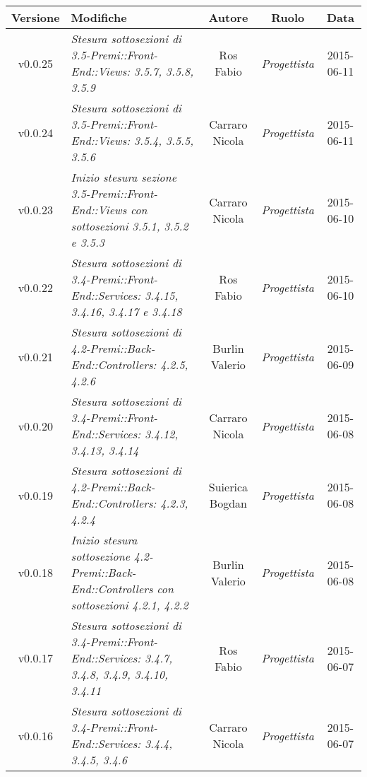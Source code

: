 \begin{table}[h]
\centering
\begin{tabular}{|c|p{}|c|c|c|}
	\toprule
		\textbf{Versione} & \textbf{Modifiche} & \textbf{Autore} & \textbf{Ruolo} & \textbf{Data}\\
	\midrule
	\midrule
		v0.0.25 & \textit{Stesura sottosezioni di 3.5-Premi::Front-End::Views: 3.5.7, 3.5.8, 3.5.9} & Ros Fabio & \textit{Progettista} & 2015-06-11\\
	\midrule
		v0.0.24 & \textit{Stesura sottosezioni di 3.5-Premi::Front-End::Views: 3.5.4, 3.5.5, 3.5.6} & Carraro Nicola & \textit{Progettista} & 2015-06-11\\
	\midrule
		v0.0.23 & \textit{Inizio stesura sezione 3.5-Premi::Front-End::Views con sottosezioni 3.5.1, 3.5.2 e 3.5.3} & Carraro Nicola & \textit{Progettista} & 2015-06-10\\
	\midrule
		v0.0.22 & \textit{Stesura sottosezioni di 3.4-Premi::Front-End::Services: 3.4.15, 3.4.16, 3.4.17 e 3.4.18} & Ros Fabio & \textit{Progettista} & 2015-06-10\\
	\midrule
		v0.0.21 & \textit{Stesura sottosezioni di 4.2-Premi::Back-End::Controllers: 4.2.5, 4.2.6} & Burlin Valerio & \textit{Progettista} & 2015-06-09\\
	\midrule
		v0.0.20 & \textit{Stesura sottosezioni di 3.4-Premi::Front-End::Services: 3.4.12, 3.4.13, 3.4.14} & Carraro Nicola & \textit{Progettista} & 2015-06-08\\
	\midrule
		v0.0.19 & \textit{Stesura sottosezioni di 4.2-Premi::Back-End::Controllers: 4.2.3, 4.2.4} & Suierica Bogdan & \textit{Progettista} & 2015-06-08\\
	\midrule
		v0.0.18 & \textit{Inizio stesura sottosezione 4.2-Premi::Back-End::Controllers con sottosezioni 4.2.1, 4.2.2} & Burlin Valerio & \textit{Progettista} & 2015-06-08\\
	\midrule
		v0.0.17 & \textit{Stesura sottosezioni di 3.4-Premi::Front-End::Services: 3.4.7, 3.4.8, 3.4.9, 3.4.10, 3.4.11} & Ros Fabio & \textit{Progettista} & 2015-06-07\\
	\midrule
		v0.0.16 & \textit{Stesura sottosezioni di 3.4-Premi::Front-End::Services: 3.4.4, 3.4.5, 3.4.6} & Carraro Nicola & \textit{Progettista} & 2015-06-07\\	
	\bottomrule
\end{tabular}
\end{table}

\newpage

